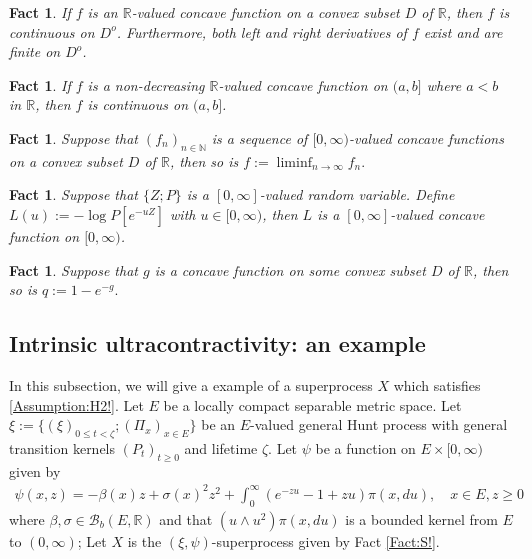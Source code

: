 \documentclass[12pt,a4paper]{amsart}
\numberwithin{equation}{section}
\theoremstyle{plain}
\newtheorem{fact}[thm]{Fact}
\theoremstyle{definition}
\theoremstyle{remark}
\newcounter{N}
\newcounter{n}[N]
\begin{document}
\begin{fact} \label{Fact:CC!}
If $f$ is an $\mathbb R$-valued concave function on a convex subset $D$ of $\mathbb R$, then $f$ is continuous on $D^o$.
Furthermore, both left and right derivatives of $f$ exist and are finite on $D^o$.
\end{fact}

\begin{fact} \label{Fact:CR!}
If $f$ is a non-decreasing $\mathbb R$-valued concave function on $(a,b]$ where $a<b$ in $\mathbb R$, then $f$ is continuous on $(a,b]$.
\end{fact}

\begin{fact} \label{Fact:CL!}
Suppose that $(f_n)_{n \in \mathbb N}$ is a sequence of $[0,\infty)$-valued concave functions on a convex subset $D$ of $\mathbb R$, then so is $f:= \liminf_{n\to \infty} f_n.$
\end{fact}

\begin{fact} \label{Fact:CP!}
Suppose that $\{Z; P\}$ is a $[0,\infty]$-valued random variable.
Define $L(u):= - \log P[e^{- u Z}]$ with $u \in [0,\infty)$, then $L$ is a $[0,\infty]$-valued concave function on $[0,\infty)$.
\end{fact}
\begin{fact} \label{Fact:CE!}
Suppose that $g$ is a concave function on some convex subset $D$ of $\mathbb R$, then so is $q:= 1- e^{-g}.$
\end{fact}
\subsection{Intrinsic ultracontractivity: an example}
In this subsection, we will give a example of a superprocess $X$ which satisfies \ref{Assumption:H2!}.
Let $E$ be a locally compact separable metric space.
Let $\xi:= \{(\xi)_{0\leq t < \zeta}; (\Pi_x)_{x\in E}\}$ be an $E$-valued general Hunt process with general transition kernels $(P_t)_{t\geq 0}$ and lifetime $\zeta$.
Let $\psi$ be a function on $E \times [0,\infty)$ given by
\begin{align}
\psi(x,z)
=- \beta(x) z + \sigma(x)^2 z^2 + \int_0^\infty (e^{-zu} -1 + zu) \pi(x,du),
\quad x\in E, z\geq 0
\end{align}
where $\beta, \sigma \in \mathcal B_b(E,\mathbb R)$ and that $(u \wedge u^2) \pi(x,du)$ is a bounded kernel from $E$ to $(0,\infty)$;
Let $X$ is the $(\xi, \psi)$-superprocess given by Fact \ref{Fact:S!}.
\end{document}

